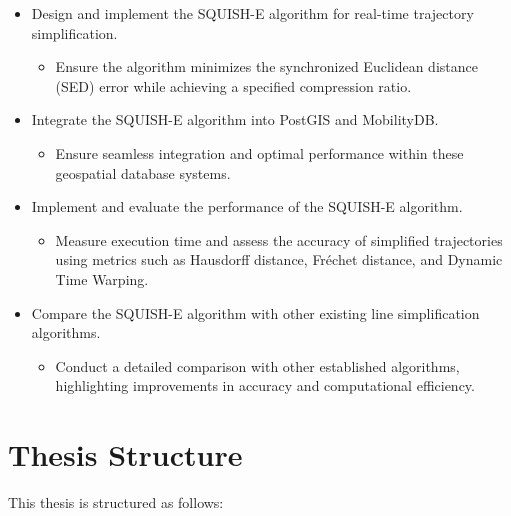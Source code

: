 \begin{itemize}
    \item Design and implement the SQUISH-E algorithm for real-time trajectory simplification.
    \begin{itemize}
        \item Ensure the algorithm minimizes the synchronized Euclidean distance (SED) error while achieving a specified compression ratio.
    \end{itemize}
    
    \item Integrate the SQUISH-E algorithm into PostGIS and MobilityDB.
    \begin{itemize}
        \item Ensure seamless integration and optimal performance within these geospatial database systems.
    \end{itemize}
    
    \item Implement and evaluate the performance of the SQUISH-E algorithm.
    \begin{itemize}
        \item Measure execution time and assess the accuracy of simplified trajectories using metrics such as Hausdorff distance, Fréchet distance, and Dynamic Time Warping.
    \end{itemize}
    
    \item Compare the SQUISH-E algorithm with other existing line simplification algorithms.
    \begin{itemize}
        \item Conduct a detailed comparison with other established algorithms, highlighting improvements in accuracy and computational efficiency.
    \end{itemize}
\end{itemize}

\section{Thesis Structure}

This thesis is structured as follows:


